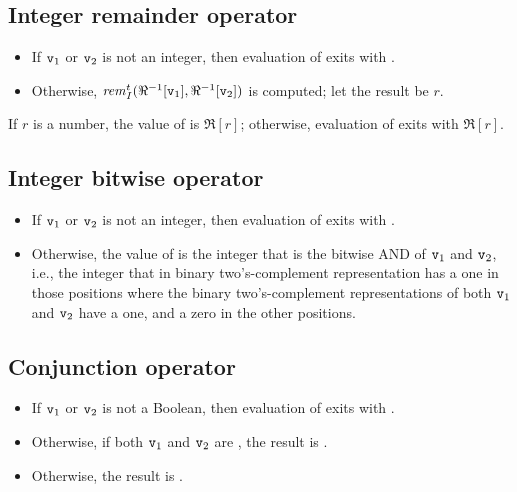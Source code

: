\subsection{Integer remainder operator }

\label{section:intrem}

\begin{itemize}
\item If ${\tt{\sl v}}_1$ or ${\tt{\sl v}}_2$ is not an integer, then
evaluation of  exits with \T{\badarith}.
\item Otherwise, $\mathit{rem}_I^t(\Re^{-1}[{\tt{\sl v}}_1],\Re^{-1}[{\tt{\sl v}}_2])$ is computed;
let the result be $r$.
\end{itemize}
If $r$ is a number, the value of  is $\Re[r]$;
otherwise, evaluation of  exits with $\Re[r]$.

\subsection{Integer bitwise operator }

\label{section:bitwiseand}

\begin{itemize}
\item If ${\tt{\sl v}}_1$ or ${\tt{\sl v}}_2$ is not an integer, then
      evaluation of  exits with \T{\badarith}.
\item Otherwise, the value of  is the integer
      that is the bitwise AND of ${\tt{\sl v}}_1$ and ${\tt{\sl v}}_2$,
      i.e., the integer that in binary two's-com\-ple\-ment
      representation has a one in those positions where the binary
      two's-com\-ple\-ment representations of both ${\tt{\sl v}}_1$ and ${\tt{\sl v}}_2$
      have a one, and a zero in the other positions.
\end{itemize}

\subsection{Conjunction operator }

\label{section:booleanand}

\begin{itemize}
\item If ${\tt{\sl v}}_1$ or ${\tt{\sl v}}_2$ is not a Boolean, then
      evaluation of  exits with
      \ifStd{}\else{}\fi.
\item Otherwise, if both ${\tt{\sl v}}_1$ and ${\tt{\sl v}}_2$ are ,
      the result is .
\item Otherwise, the result is .
\end{itemize}

